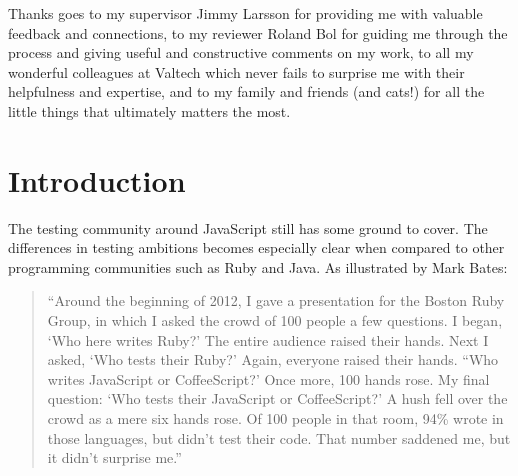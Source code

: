 \documentclass[11pt]{article}
\begin{document}
Thanks goes to my supervisor Jimmy Larsson for providing me with valuable feedback and connections, to my reviewer Roland Bol for guiding me through the process and giving useful and constructive comments on my work, to all my wonderful colleagues at Valtech which never fails to surprise me with their helpfulness and expertise, and to my family and friends (and cats!) for all the little things that ultimately matters the most.

\newpage
\clearpage\mbox{}\clearpage
\newpage

\tableofcontents

\newpage
\clearpage\mbox{}\clearpage
\newpage


\section{Introduction}

The testing community around JavaScript still has some ground to cover. The differences in testing ambitions becomes especially clear when compared to other programming communities such as Ruby and Java. As illustrated by Mark Bates\cite{TestingStatistics}:

\begin{quote}
``Around the beginning of 2012, I gave a presentation for the Boston Ruby Group, in which I asked the crowd of 100 people a few questions. I began, `Who here writes Ruby?' The entire audience raised their hands. Next I asked, `Who tests their Ruby?' Again, everyone raised their hands. ``Who writes JavaScript or CoffeeScript?' Once more, 100 hands rose. My final question: `Who tests their JavaScript or CoffeeScript?' A hush fell over the crowd as a mere six hands rose. Of 100 people in that room, 94\% wrote in those languages, but didn't test their code. That number saddened me, but it didn't surprise me.''
\end{quote}
\end{document}

